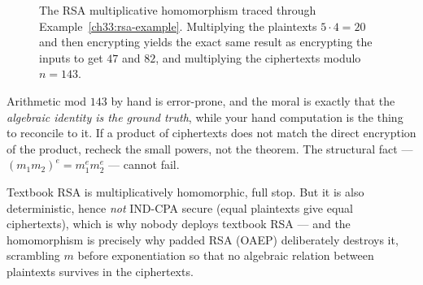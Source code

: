 \begin{figure}[H]
\centering
{}
\caption{The RSA multiplicative homomorphism traced through Example~\ref{ch33:rsa-example}. Multiplying the plaintexts $5 \cdot 4 = 20$ and then encrypting yields the exact same result as encrypting the inputs to get $47$ and $82$, and multiplying the ciphertexts modulo $n=143$.}
\label{ch33:fig-rsa-trace}
\end{figure}

\begin{trapbox}
Arithmetic mod $143$ by hand is error-prone, and the moral is exactly that the \emph{algebraic identity is the ground truth}, while your hand computation is the thing to reconcile to it. If a product of ciphertexts does not match the direct encryption of the product, recheck the small powers, not the theorem. The structural fact --- $(m_1 m_2)^e = m_1^e m_2^e$ --- cannot fail.
\end{trapbox}

Textbook RSA is multiplicatively homomorphic, full stop. But it is also deterministic, hence \emph{not} IND-CPA secure (equal plaintexts give equal ciphertexts), which is why nobody deploys textbook RSA --- and the homomorphism is precisely why padded RSA (OAEP) deliberately destroys it, scrambling $m$ before exponentiation so that no algebraic relation between plaintexts survives in the ciphertexts.

